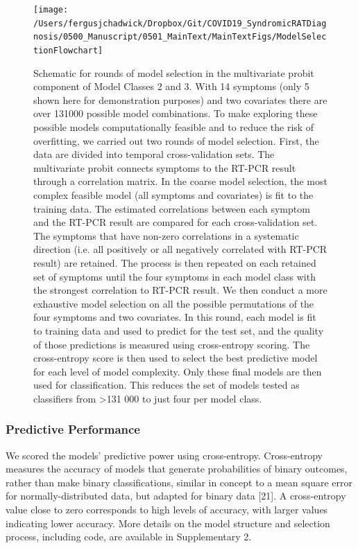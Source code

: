 \documentclass[]{elsarticle} %
\begin{document}
\begin{figure}
\texttt{[image: /Users/fergusjchadwick/Dropbox/Git/COVID19\_SyndromicRATDiagnosis/0500\_Manuscript/0501\_MainText/MainTextFigs/ModelSelectionFlowchart]} \caption{Schematic for rounds of model selection in the multivariate probit component of Model Classes 2 and 3. With 14 symptoms (only 5 shown here for demonstration purposes) and two covariates there are over 131000 possible model combinations. To make exploring these possible models computationally feasible and to reduce the risk of overfitting, we carried out two rounds of model selection. First, the data are divided into temporal cross-validation sets. The multivariate probit connects symptoms to the RT-PCR result through a correlation matrix. In the coarse model selection, the most complex feasible model (all symptoms and covariates) is fit to the training data. The estimated correlations between each symptom and the RT-PCR result are compared for each cross-validation set. The symptoms that have non-zero correlations in a systematic direction (i.e. all positively or all negatively correlated with RT-PCR result) are retained. The process is then repeated on each retained set of symptoms until the four symptoms in each model class with the strongest correlation to RT-PCR result. We then conduct a more exhaustive model selection on all the possible permutations of the four symptoms and two covariates. In this round, each model is fit to training data and used to predict for the test set, and the quality of those predictions is measured using cross-entropy scoring. The cross-entropy score is then used to select the best predictive model for each level of model complexity. Only these final models are then used for classification. This reduces the set of models tested as classifiers from >131 000 to just four per model class.}\label{fig:modsel-flowchart}
\end{figure}

\hypertarget{predictive-performance}{%
\subsubsection{Predictive Performance}\label{predictive-performance}}

We scored the models' predictive power using cross-entropy.
Cross-entropy measures the accuracy of models that generate probabilities of binary outcomes, rather than make binary classifications, similar in concept to a mean square error for normally-distributed data, but adapted for binary data {[}21{]}.
A cross-entropy value close to zero corresponds to high levels of accuracy, with larger values indicating lower accuracy.
More details on the model structure and selection process, including code, are available in Supplementary 2.
\end{document}
